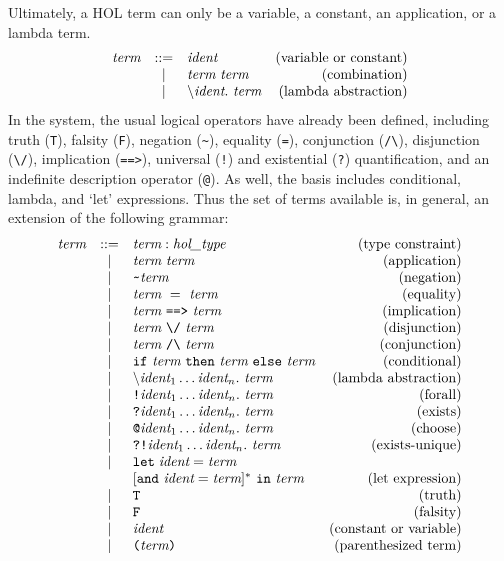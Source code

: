 {Ultimately, a HOL term can only be a variable, a constant, an
application, or a lambda term.
\[
\begin{array}{rclr}
  \mbox{\it term} & ::= & \mbox{\it ident} & \mbox{(variable or constant)} \\
  & | &  \mbox{\it term}\  \mbox{\it term} & \mbox{(combination)} \\
  & | &  \mbox{$\backslash$}\mbox{\it ident}.\  \mbox{\it term} &
  \mbox{(lambda abstraction)}
\end{array}
\]
In the system, the usual logical operators have already been defined,
including truth (\verb+T+), falsity (\verb+F+), negation (\verb+~+),
equality (\verb+=+), conjunction (\verb+/\+), disjunction (\verb+\/+),
implication (\verb+==>+), universal (\verb+!+) and existential
(\verb+?+) quantification, and an indefinite description operator
(\verb+@+). As well, the basis includes conditional, lambda, and `let'
expressions. Thus the set of terms available is, in general, an
extension of the following grammar:
\[
\begin{array}{rclr}
  \mbox{\it term} & ::= & \term : \type & \mbox{(type constraint)} \\
  & | & \term\ \term & \mbox{(application)} \\
  & | & \verb+~+ \term & \mbox{(negation)} \\
  & | & \term\ =\ \term & \mbox{(equality)} \\
  & | & \term\ \IMP\ \term & \mbox{(implication)} \\
  & | & \term\ \verb+\/+\ \term & \mbox{(disjunction)} \\
  & | & \term\ \verb+/\+\ \term & \mbox{(conjunction)} \\
  & | & \texttt{if}\ \term\ \texttt{then}\ \term\ \texttt{else}\ \term &
  \mbox{(conditional)} \\
  & | & \bs\ident_1\ldots\ident_n.\  \term & \mbox{(lambda abstraction)} \\
  & | & \ALL \ident_1\ldots\ident_n.\ \term & \mbox{(forall)} \\
  & | & \EXISTS \ident_1\ldots\ident_n.\ \term & \mbox{(exists)} \\
  & | & \CHOOSE \ident_1\ldots\ident_n.\ \term & \mbox{(choose)} \\
  & | & \EXISTSONE \ident_1\ldots\ident_n.\ \term &\mbox{(exists-unique)} \\
  & | & \LET\; \ident = \term  & \\
  &   & [\und\ \ident = \term]^{*}\ \IN\ \term & \mbox{(let expression)} \\
  & | & \verb+T+ & \mbox{(truth)} \\
  & | & \verb+F+ & \mbox{(falsity)} \\
  & | & \ident & \mbox{(constant or variable)} \\
  & | & \verb+(+ \term \verb+)+ & \mbox{(parenthesized term)}
\end{array}
\]

}
